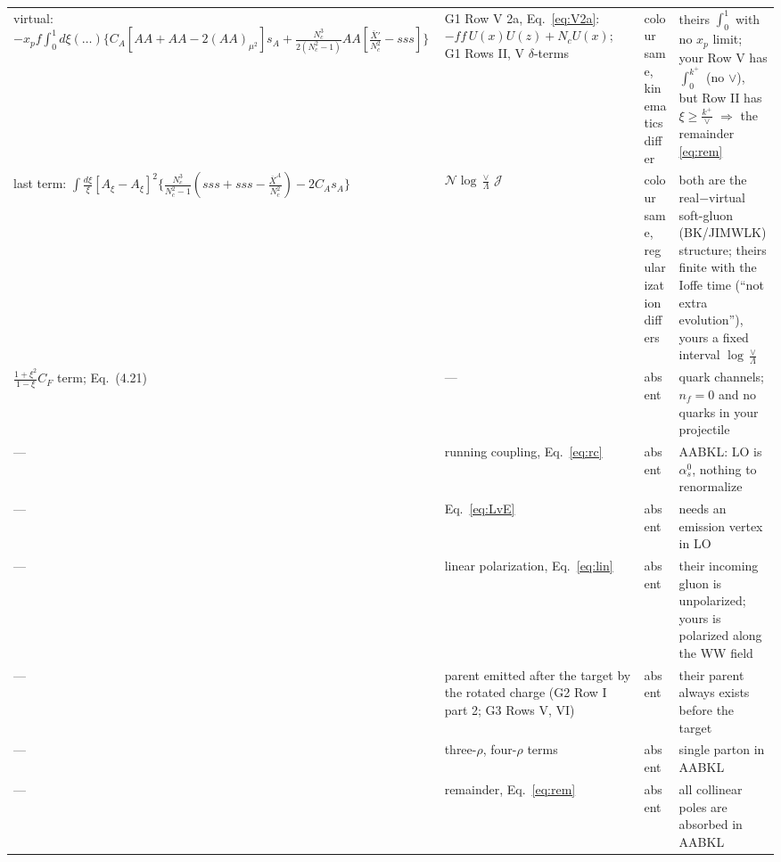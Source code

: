 \documentclass[10pt]{article}
\numberwithin{equation}{section}
\newcommand{\new}[1]{{\color{blue}#1}}
\newcommand{\old}[1]{{\color{red}#1}}
\newcommand{\JJ}{\mathcal J}
\newcommand{\NN}{\mathcal N}
\begin{document}
{\begin{longtable}{@{}>{\raggedright\arraybackslash}p{}>{\raggedright\arraybackslash}p{}>{\raggedright\arraybackslash}p{}>{\raggedright\arraybackslash}p{}@{}}
virtual: $-x_pf\int_0^1d\xi(\dots)\{C_A[AA+AA-2(AA)_{\mu^2}]s_A+\frac{N_c^3}{2(N_c^2-1)}AA[\frac{\overline X'}{N_c^2}-sss]\}$ & G1 Row V 2a, Eq.~\eqref{eq:V2a}: $-ff\,U(x)U(z)+N_cU(x)$; G1 Rows II, V $\delta$-terms & \new{colour same}, \old{kinematics differ} & theirs $\int_0^1$ with no $x_p$ limit; your Row V has $\int_0^{k^+}$ (no $\vee$), but Row II has $\xi\ge\frac{k^+}{\vee}$ $\Rightarrow$ the remainder \eqref{eq:rem}\\
last term: $\int\frac{d\xi}{\xi}[A_\xi-A_\xi]^2\{\frac{N_c^3}{N_c^2-1}(sss+sss-\frac{\overline X^A}{N_c^2})-2C_As_A\}$ & $\NN\log\frac\vee\Lambda\,\JJ$ & \new{colour same}, \old{regularization differs} & both are the real$-$virtual soft-gluon (BK/JIMWLK) structure; theirs finite with the Ioffe time (``not extra evolution''), yours a fixed interval $\log\frac\vee\Lambda$\\
$\frac{1+\xi^2}{1-\xi}C_F$ term; Eq.~(4.21) & --- & \old{absent} & quark channels; $n_f=0$ and no quarks in your projectile\\
--- & running coupling, Eq.~\eqref{eq:rc} & \old{absent} & AABKL: LO is $\alpha_s^0$, nothing to renormalize\\
--- & Eq.~\eqref{eq:LvE} & \old{absent} & needs an emission vertex in LO\\
--- & linear polarization, Eq.~\eqref{eq:lin} & \old{absent} & their incoming gluon is unpolarized; yours is polarized along the WW field\\
--- & parent emitted after the target by the rotated charge (G2 Row I part 2; G3 Rows V, VI) & \old{absent} & their parent always exists before the target\\
--- & three-$\rho$, four-$\rho$ terms & \old{absent} & single parton in AABKL\\
--- & remainder, Eq.~\eqref{eq:rem} & \old{absent} & all collinear poles are absorbed in AABKL\\\bottomrule
\end{longtable}}
\end{document}
